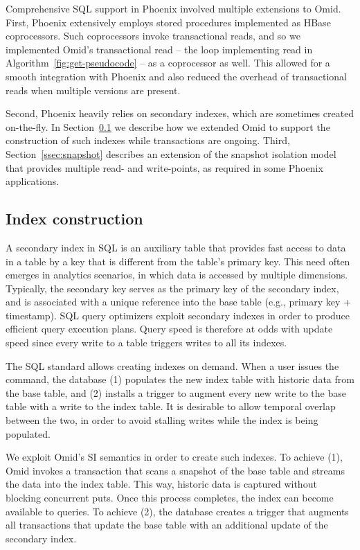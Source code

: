 

Comprehensive SQL support in Phoenix involved multiple extensions to Omid. 
First, Phoenix extensively employs stored procedures implemented as HBase coprocessors. 
Such coprocessors invoke transactional reads, and so we implemented Omid's 
transactional read -- the loop implementing read in Algorithm~\ref{fig:get-pseudocode} -- as a coprocessor as well. 
This allowed for a smooth integration  with Phoenix and also reduced the overhead of transactional
reads when multiple versions are present.

Second, Phoenix heavily relies on secondary indexes, which are sometimes created on-the-fly. 
In Section~\ref{ssec:indexes} we describe how we extended Omid to support the construction 
of such indexes while transactions are ongoing. Third, Section~\ref{ssec:snapshot} describes an 
extension of the snapshot isolation model that provides multiple read- and write-points, as required 
in some Phoenix applications. 

\subsection{Index construction}
\label{ssec:indexes}

A secondary index in SQL is an auxiliary table that provides fast access to data in a table 
by a key that is different from the table's primary key. This need often emerges in analytics scenarios, in
which data is accessed by multiple dimensions. Typically, the secondary key serves as the 
primary key of the secondary index, and is associated with a unique reference into the base table 
(e.g., primary key + timestamp). SQL query 
optimizers exploit secondary indexes in order to produce efficient query execution plans. Query speed 
is therefore at odds with update speed since every write to a table triggers writes to all its indexes. 

The SQL standard allows creating indexes on demand. When a user issues the {} 
command, the database (1) populates the new index table with historic data from the base table, and
(2) installs a trigger to augment every new write to the base table with a write to the index table. 
It is desirable to allow temporal overlap between the two, in order to avoid stalling  writes while 
the index is being populated. 

We exploit Omid's SI semantics in order to create such indexes. To achieve (1), Omid invokes a 
transaction that scans a snapshot of the base table and streams the data into the  
index table. This way, historic data is captured without blocking concurrent puts. Once this 
process completes, the index can become available to queries. 
To achieve (2), the database creates a trigger that augments all transactions that update the base table 
with an additional update of the secondary index. 
 
